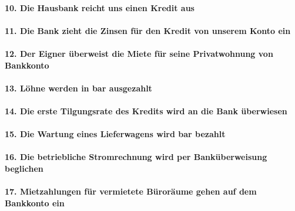 \documentclass[paper=a4, fontsize=11pt]{scrartcl}
\numberwithin{equation}{section}
\numberwithin{figure}{section}
\numberwithin{table}{section}
\begin{document}
\paragraph{10. Die Hausbank reicht uns einen Kredit aus}

\paragraph{11. Die Bank zieht die Zinsen für den Kredit von unserem Konto ein}

\paragraph{12. Der Eigner überweist die Miete für seine Privatwohnung von Bankkonto}

\paragraph{13. Löhne werden in bar ausgezahlt}

\paragraph{14. Die erste Tilgungsrate des Kredits wird an die Bank überwiesen}

\paragraph{15. Die Wartung eines Lieferwagens wird bar bezahlt}

\paragraph{16. Die betriebliche Stromrechnung wird per Banküberweisung beglichen}

\paragraph{17. Mietzahlungen für vermietete Büroräume gehen auf dem Bankkonto ein}

\end{document}
